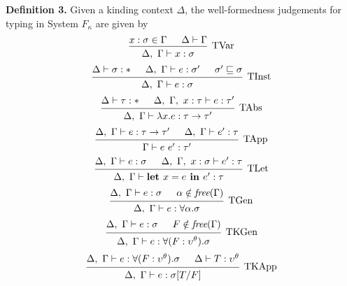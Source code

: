 \documentclass[../../Dissertation.tex]{subfiles}
\begin{document}
{
\noindent
\textbf{Definition 3.} Given a kinding context $\Delta$, the well-formedness judgements for typing in System $F_\kappa$ are given by
\begin{equation*}
  \begin{prooftree}
    \hypo{x : \sigma \in \Gamma}
    \hypo{\Delta \vdash \Gamma}
    \infer2[TVar]{\Delta,\ \Gamma \vdash x : \sigma}
  \end{prooftree}
\end{equation*}
\begin{equation*}
  \begin{prooftree}
    \hypo{\Delta \vdash \sigma : *}
    \hypo{\Delta,\ \Gamma \vdash e : \sigma'}
    \hypo{\sigma' \sqsubseteq \sigma}
    \infer3[TInst]{\Delta,\ \Gamma \vdash e : \sigma}
  \end{prooftree}
\end{equation*}
\begin{equation*}
  \begin{prooftree}
    \hypo{\Delta \vdash \tau : *}
    \hypo{\Delta,\ \Gamma,\ x : \tau \vdash e : \tau'}
    \infer2[TAbs]{\Delta,\ \Gamma \vdash \lambda x.e : \tau \rightarrow \tau'}
  \end{prooftree}
\end{equation*}
\begin{equation*}
  \begin{prooftree}
    \hypo{\Delta,\ \Gamma \vdash e : \tau \rightarrow \tau'}
    \hypo{\Delta,\ \Gamma \vdash e' : \tau}
    \infer2[TApp]{\Gamma \vdash e\ e' : \tau'}
  \end{prooftree}
\end{equation*}
\begin{equation*} 
  \begin{prooftree}
    \hypo{\Delta,\ \Gamma \vdash e : \sigma}
    \hypo{\Delta,\ \Gamma,\ x : \sigma \vdash e' : \tau}
    \infer2[TLet]{\Delta,\ \Gamma \vdash \textbf{let } x = e \textbf{ in } e' : \tau}
  \end{prooftree}
\end{equation*}
\begin{equation*}
  \begin{prooftree}
    \hypo{\Delta,\ \Gamma \vdash e : \sigma}
    \hypo{\alpha \notin \textit{free}(\Gamma)}
    \infer2[TGen]{\Delta,\ \Gamma \vdash e : \forall \alpha.\sigma}
  \end{prooftree}
\end{equation*}
\begin{equation*}
  \begin{prooftree}
    \hypo{\Delta,\ \Gamma \vdash e : \sigma}
    \hypo{F \notin \textit{free}(\Gamma)}
    \infer2[TKGen]{\Delta,\ \Gamma \vdash e : \forall (F : \upsilon^\theta).\sigma}
  \end{prooftree}
\end{equation*}
\begin{equation*}
  \begin{prooftree}
    \hypo{\Delta,\ \Gamma \vdash e : \forall (F : \upsilon^\theta).\sigma}
    \hypo{\Delta \vdash T : \upsilon^\theta}
    \infer2[TKApp]{\Delta,\ \Gamma \vdash e : \sigma[T/F]}
  \end{prooftree}
\end{equation*}
}
\end{document}
